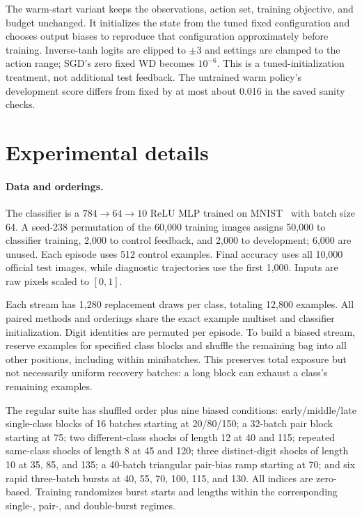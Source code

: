 \documentclass{article}
\begin{document}
The warm-start variant keeps the observations, action set, training objective, and budget unchanged. It initializes the state from the tuned fixed configuration and chooses output biases to reproduce that configuration approximately before training. Inverse-tanh logits are clipped to $\pm3$ and settings are clamped to the action range; SGD's zero fixed WD becomes $10^{-6}$. This is a tuned-initialization treatment, not additional test feedback. The untrained warm policy's development score differs from fixed by at most about 0.016 in the saved sanity checks.


\section{Experimental details}\label{app:setup}
\paragraph{Data and orderings.}
The classifier is a $784\rightarrow64\rightarrow10$ ReLU MLP trained on MNIST~\cite{lecun1998} with batch size 64. A seed-238 permutation of the 60,000 training images assigns 50,000 to classifier training, 2,000 to control feedback, and 2,000 to development; 6,000 are unused. Each episode uses 512 control examples. Final accuracy uses all 10,000 official test images, while diagnostic trajectories use the first 1,000. Inputs are raw pixels scaled to $[0,1]$.

Each stream has 1,280 replacement draws per class, totaling 12,800 examples. All paired methods and orderings share the exact example multiset and classifier initialization. Digit identities are permuted per episode. To build a biased stream, reserve examples for specified class blocks and shuffle the remaining bag into all other positions, including within minibatches. This preserves total exposure but not necessarily uniform recovery batches: a long block can exhaust a class's remaining examples.

The regular suite has shuffled order plus nine biased conditions: early/middle/late single-class blocks of 16 batches starting at 20/80/150; a 32-batch pair block starting at 75; two different-class shocks of length 12 at 40 and 115; repeated same-class shocks of length 8 at 45 and 120; three distinct-digit shocks of length 10 at 35, 85, and 135; a 40-batch triangular pair-bias ramp starting at 70; and six rapid three-batch bursts at 40, 55, 70, 100, 115, and 130. All indices are zero-based. Training randomizes burst starts and lengths within the corresponding single-, pair-, and double-burst regimes.
\end{document}
